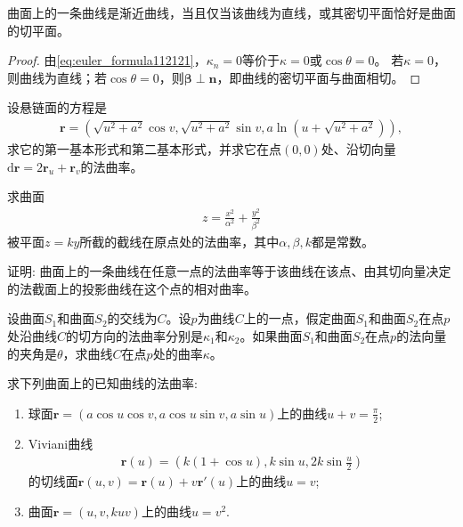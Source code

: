 \documentclass[../../main.tex]{subfiles}%
\begin{document}
\begin{theorem}
曲面上的一条曲线是渐近曲线，当且仅当该曲线为直线，或其密切平面恰好是曲面的切平面。
\end{theorem}
\begin{proof}
由\eqref{eq:euler_formula112121}，$\kappa_n=0$等价于$\kappa=0$或$\cos\theta=0$。
若$\kappa=0$，则曲线为直线；若$\cos\theta=0$，则$\boldsymbol{\beta}\perp\boldsymbol{n}$，即曲线的密切平面与曲面相切。
\end{proof}

\begin{example}
设悬链面的方程是
\begin{align*}
\boldsymbol{r} = \left( \sqrt{u^2 + a^2}\cos v,\sqrt{u^2 + a^2}\sin v,a\ln\left(u + \sqrt{u^2 + a^2}\right) \right),
\end{align*}
求它的第一基本形式和第二基本形式，并求它在点$(0,0)$处、沿切向量$\mathrm{d}\boldsymbol{r} = 2\boldsymbol{r}_u + \boldsymbol{r}_v$的法曲率。
\end{example}

\begin{example}
求曲面
\begin{align*}
z = \frac{x^2}{\alpha^2} + \frac{y^2}{\beta^2}
\end{align*}
被平面$z = ky$所截的截线在原点处的法曲率，其中$\alpha,\beta,k$都是常数。
\end{example}

\begin{example}
证明: 曲面上的一条曲线在任意一点的法曲率等于该曲线在该点、由其切向量决定的法截面上的投影曲线在这个点的相对曲率。
\end{example}

\begin{example}
设曲面$S_1$和曲面$S_2$的交线为$C$。设$p$为曲线$C$上的一点，假定曲面$S_1$和曲面$S_2$在点$p$处沿曲线$C$的切方向的法曲率分别是$\kappa_1$和$\kappa_2$。如果曲面$S_1$和曲面$S_2$在点$p$的法向量的夹角是$\theta$，求曲线$C$在点$p$处的曲率$\kappa$。
\end{example}

\begin{example}
求下列曲面上的已知曲线的法曲率:
\begin{enumerate}[(1)]
\item 球面$\boldsymbol{r} = (a\cos u\cos v,a\cos u\sin v,a\sin u)$上的曲线$u + v = \frac{\pi}{2}$;
\item Viviani曲线
\begin{align*}
\boldsymbol{r}(u) = \left( k(1+\cos u),k\sin u,2k\sin\frac{u}{2} \right)
\end{align*}
的切线面$\boldsymbol{r}(u,v) = \boldsymbol{r}(u) + v\boldsymbol{r}'(u)$上的曲线$u = v$;
\item 曲面$\boldsymbol{r} = (u,v,kuv)$上的曲线$u = v^2$.
\end{enumerate}
\end{example}
\end{document}
